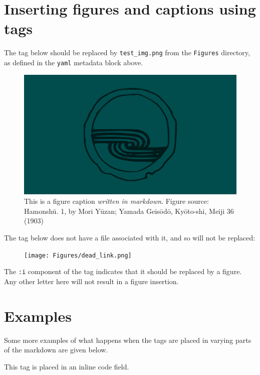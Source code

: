 \documentclass[
]{article}
\author{}
\date{}
\begin{document}
\hypertarget{inserting-figures-and-captions-using-tags}{%
\section{Inserting figures and captions using
tags}\label{inserting-figures-and-captions-using-tags}}

The tag below should be replaced by \texttt{test\_img.png} from the
\texttt{Figures} directory, as defined in the \texttt{yaml} metadata
block above.

\begin{figure}
\centering
\includegraphics{Figures/test_img.png}
\caption{This is a figure caption \emph{written in markdown}. Figure
source: Hamonshū. 1, by Mori Yūzan; Yamada Geisōdō, Kyōto-shi, Meiji 36
(1903)}
\end{figure}

The tag below does not have a file associated with it, and so will not
be replaced:

\begin{figure}
\centering
\texttt{[image: Figures/dead\_link.png]}
\caption{}
\end{figure}

The \texttt{:i} component of the tag indicates that it should be
replaced by a figure. Any other letter here will not result in a figure
insertion.

\hypertarget{examples}{%
\section{Examples}\label{examples}}

Some more examples of what happens when the tags are placed in varying
parts of the markdown are given below.

This tag is placed in an inline code field.
\end{document}
